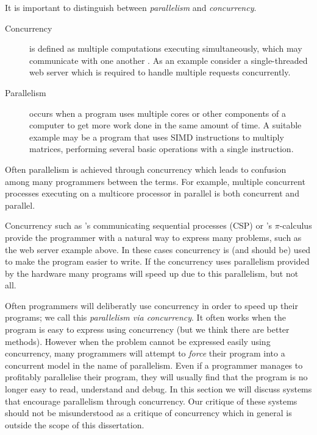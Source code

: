 It is important to distinguish between \emph{parallelism} and
\emph{concurrency}.

\begin{description}
    \item[Concurrency] is defined as multiple computations executing simultaneously,
    which may communicate with one another \citep{hoare:1978:csp}.
    As an example consider a single-threaded web server which is required to
    handle multiple requests concurrently.

    \item[Parallelism] occurs when a program uses multiple cores or other
    components of a computer to get more work done in the same amount of
    time.
    A suitable example may be a program that uses SIMD instructions to
    multiply matrices, performing several basic operations with a single
    instruction.
\end{description}

\noindent
Often parallelism is achieved through concurrency
which leads to confusion among many programmers between the terms.
For example,
multiple concurrent processes executing on a multicore processor in parallel
is both concurrent and parallel.

Concurrency such as \citet{hoare:1978:csp}'s
communicating sequential processes (CSP)
or \citet{milner:pi}'s $\pi$-calculus
provide the programmer with a natural way to express many problems,
such as the web server example above.
In these cases concurrency is (and should be) used to make the program
easier to write.
If the concurrency uses parallelism provided by the hardware many programs
will speed up due to this parallelism,
but not all.

Often programmers will deliberatly use concurrency in order to speed up
their programs;
we call this \emph{parallelism via concurrency}.
It often works when the program is easy to express using concurrency
(but we think there are better methods).
However when the problem cannot be expressed easily using concurrency,
many programmers will attempt to \emph{force} their program into a concurrent
model in the name of parallelism.
Even if a programmer manages to profitably parallelise their program,
they will usually find that the program is no longer easy to read, understand
and debug.
In this section we will discuss systems that encourage parallelism through
concurrency.
Our critique of these systems should not be misunderstood as a critique of
concurrency which in general is outside the scope of this dissertation.

